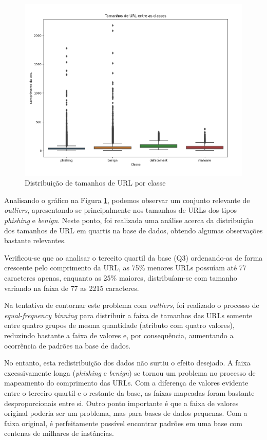 \documentclass[a4paper, 12pt]{article}
\begin{document}
\begin{figure}[H]
    \centering
    \includegraphics[width=1\textwidth]{Images/Figure_6.png}
    \caption{Distribuição de tamanhos de URL por classe}
    \label{fig:exampleFig3}
\end{figure}

Analisando o gráfico na Figura \ref{fig:exampleFig3}, podemos observar um conjunto relevante de \emph{outliers}, apresentando-se principalmente nos tamanhos de URLs dos tipos \emph{phishing} e \emph{benign}. Neste ponto, foi realizada uma análise acerca da distribuição dos tamanhos de URL em quartis na base de dados, obtendo algumas observações bastante relevantes.

Verificou-se que ao analisar o terceito quartil da base (Q3) ordenando-as de forma crescente pelo comprimento da URL, as 75\% menores URLs possuíam até 77 caracteres apenas, enquanto as 25\% maiores, distribuíam-se com tamanho variando na faixa de 77 as 2215 caracteres. 

Na tentativa de contornar este problema com \emph{outliers}, foi realizado o processo de \emph{equal-frequency binning} para distribuir a faixa de tamanhos das URLs somente entre quatro grupos de mesma quantidade (atributo com quatro valores), reduzindo bastante a faixa de valores e, por consequência, aumentando a ocorrência de padrões na base de dados.

No entanto, esta redistribuição dos dados não surtiu o efeito desejado. A faixa excessivamente longa (\emph{phishing} e \emph{benign}) se tornou um problema no processo de mapeamento do comprimento das URLs. Com a diferença de valores evidente entre o terceiro quartil e o restante da base, as faixas mapeadas foram bastante desproporcionais entre si. Outro ponto importante é que a faixa de valores original poderia ser um problema, mas para bases de dados pequenas. Com a faixa original, é perfeitamente possível encontrar padrões em uma base com centenas de milhares de instâncias.
\end{document}
